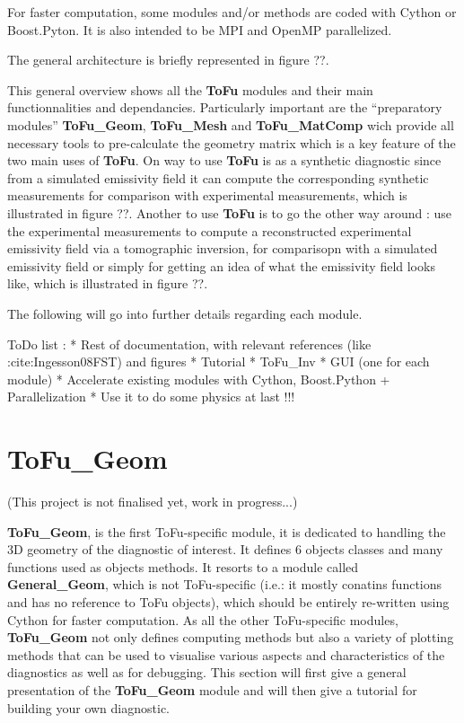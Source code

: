 \documentclass[letterpaper,10pt,english]{sphinxmanual}
\begin{document}
For faster computation, some modules and/or methods are coded with Cython or Boost.Pyton. It is also intended to be MPI and OpenMP parallelized.

The general architecture is briefly represented in figure ??.

This general overview shows all the \textbf{ToFu} modules and their main functionnalities and dependancies. Particularly important are the ``preparatory modules'' \textbf{ToFu\_Geom}, \textbf{ToFu\_Mesh} and \textbf{ToFu\_MatComp} wich provide all necessary tools to pre-calculate the geometry matrix which is a key feature of the two main uses of \textbf{ToFu}. On way to use \textbf{ToFu} is as a synthetic diagnostic since from a simulated emissivity field it can compute the corresponding synthetic measurements for comparison with experimental measurements, which is illustrated in figure ??. Another to use \textbf{ToFu} is to go the other way around : use the experimental measurements to compute a reconstructed experimental emissivity field via a tomographic inversion, for comparisopn with a simulated emissivity field or simply for getting an idea of what the emissivity field looks like, which is illustrated in figure ??.

The following will go into further details regarding each module.

ToDo list :
* Rest of documentation, with relevant references (like :cite:Ingesson08FST) and figures
* Tutorial
* ToFu\_Inv
* GUI (one for each module)
* Accelerate existing modules with Cython, Boost.Python + Parallelization
* Use it to do some physics at last !!!


\chapter{ToFu\_Geom}
\label{ToFu_Geom:overview}\label{ToFu_Geom:tofu-geom}\label{ToFu_Geom::doc}
(This project is not finalised yet, work in progress...)

\textbf{ToFu\_Geom}, is the first ToFu-specific module, it is dedicated to handling the 3D geometry of the diagnostic of interest. It defines 6 objects classes and many functions used as objects methods. It resorts to a module called \textbf{General\_Geom}, which is not ToFu-specific (i.e.: it mostly conatins functions and has no reference to ToFu objects), which should be entirely re-written using Cython for faster computation. As all the other ToFu-specific modules, \textbf{ToFu\_Geom} not only defines computing methods but also a variety of plotting methods that can be used to visualise various aspects and characteristics of the diagnostics as well as for debugging.
This section will first give a general presentation of the \textbf{ToFu\_Geom} module and will then give a tutorial for building your own diagnostic.
\end{document}
